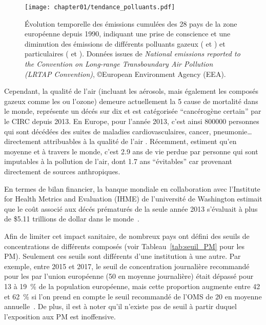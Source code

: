 \begin{figure}[ht]
    \centering
    \texttt{[image: chapter01/tendance\_polluants.pdf]}
    \caption{Évolution temporelle des émissions cumulées des 28 pays de la zone européenne
    depuis 1990, indiquant une prise de conscience et une diminution des émissions de
    différents polluants gazeux ( et ) et particulaires (\PMdix{} et \PMdc). Données
issues de \textit{National emissions reported to the Convention on Long-range
Transboundary Air Pollution (LRTAP Convention)}, ©European Environment Agency (EEA).}%
\label{fig:chapter01/tendance_polluants}
\end{figure}


Cependant, la qualité de l'air (incluant les aérosols, mais également les
composés gazeux comme les  ou l'ozone) demeure actuellement la 5\ieme{} cause de
mortalité dans le monde, représente un décés sur dix et est catégorisée ``cancérogène
certain'' par le CIRC depuis 2013. En Europe, pour l'année 2013, c'est
ainsi \num{800000} personnes qui sont décédées des suites de maladies cardiovasculaires,
cancer, pneumonie… directement attribuables à la qualité de l'air
\autocite{worldhealthorganizationAmbient2016}. Récemment, \cite{lelieveldLoss2020}
estiment qu'en moyenne et à travers le monde, c'est \num{2.9} ans de vie perdue par personne
qui sont imputables à la pollution de l'air, dont \num{1.7} ans ``évitables'' car provenant
directement de sources anthropiques.

En termes de bilan financier, la banque mondiale en collaboration avec l'Institute for
Health Metrics and Evaluation (IHME) de l'université de Washington estimait que le coût
associé aux décés prématurés de la seule année 2013 s'évaluait à plus de \$5.11 trillions
de dollar dans le monde~\autocite{worldbankCost2016}.

Afin de limiter cet impact sanitaire, de nombreux pays ont défini des seuils de
concentrations de différents composés (voir Tableau~\ref{tab:seuil_PM} pour les PM).
Seulement ces seuils sont différents d'une institution à une autre. Par exemple, entre
2015 et 2017, le seuil de concentration journalière recommandé pour les \PMdix{} par
l'union européenne (\SI{50}{\ugm} en moyenne journalière) était dépassé pour 13 à
19~\% de la population européenne, mais cette proportion augmente entre 42 et 62~\% si
l'on prend en compte le seuil recommandé de l'OMS de \SI{20}{\ugm} en moyenne
annuelle~\autocite{europeanenvironmentagencyAir2019}.  De plus, il est à noter qu'il
n'existe pas de seuil à partir duquel l'exposition aux PM est inoffensive.

